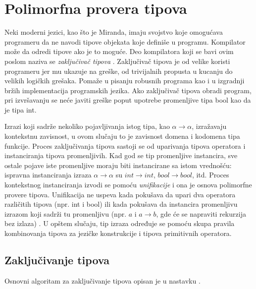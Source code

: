 \section{Polimorfna provera tipova}
\label{sec:provera tipova}

Neki moderni jezici, kao što je Miranda, imaju svojstvo koje omogućava programeru da ne navodi tipove objekata koje definiše u programu. Kompilator može da odredi tipove ako je to moguće. Deo kompilatora koji se bavi ovim poslom naziva se \textit{zaključivač tipova} \cite{the-implementation-of-functional-programming-languages}. Zaključivač tipova je od velike koristi programeru jer mu ukazuje na greške, od trivijalnih propusta u kucanju do velikih logičkih grešaka. Pomaže u pisanju robusnih programa kao i u izgradnji bržih implementacija programskih jezika. Ako zaključivač tipova obradi program, pri izvršavanju se neće javiti greške poput upotrebe promenljive tipa bool kao da je tipa int.

Izrazi koji sadrže nekoliko pojavljivanja istog tipa, kao $\alpha \longrightarrow \alpha$, izražavaju kontekstnu zavisnost, u ovom slučaju to je zavisnost domena i kodomena tipa funkcije. Proces zaključivanja tipova sastoji se od uparivanja tipova operatora i instanciranja tipova promenljivih. Kad god se tip promenljive instancira, sve ostale pojave iste promenljive moraju biti instancirane sa istom vrednošću: ispravna instanciranja izraza $\alpha \longrightarrow \alpha$ su $int \longrightarrow int$,  $bool \longrightarrow bool$, itd. Proces kontekstnog instanciranja izvodi se pomoću \textit{unifikacije} i ona je osnova polimorfne provere tipova. Unifikacija ne uspeva kada pokušava da upari dva operatora različitih tipova (npr. int i bool) ili kada pokušava da instancira promenljivu izrazom koji sadrži tu promenljivu (npr. $a$ i $a\longrightarrow b$, gde će se napraviti rekurzija bez izlaza) \cite{basic-typechecking}. U opštem slučaju, tip izraza određuje se pomoću skupa pravila kombinovanja tipova za jezičke konstrukcije i tipova primitivnih operatora. 

\subsection{Zaključivanje tipova}
\label{subsec: zakljucivanje tipova}

Osnovni algoritam za zaključivanje tipova opisan je u nastavku \cite{basic-typechecking}.

